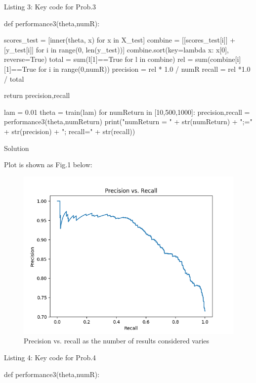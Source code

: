 \documentclass{assignment}
\begin{document}
\begin{problemlist}
\vspace{17ex}
\begin{center} 
Listing 3: Key code for Prob.3
\end{center}
\begin{python}
def performance3(theta,numR):

    scores_test = [inner(theta, x) for x in X_test]
    combine = [[scores_test[i]] + [y_test[i]] for i in range(0, len(y_test))]
    combine.sort(key=lambda x: x[0], reverse=True)
    total = sum(l[1]==True for l in combine)
    rel = sum(combine[i][1]==True for i in range(0,numR))
    precision = rel * 1.0 / numR
    recall = rel *1.0 / total

    return precision,recall

lam = 0.01
theta = train(lam)
for numReturn in [10,500,1000]:
    precision,recall = performance3(theta,numReturn)
    print("numReturn = " + str(numReturn) + ";\tprecision=" + str(precision) + "; recall=" + str(recall))
\end{python}

\pbitem Solution

Plot is shown as Fig.1 below:
\begin{figure}[H]
\centering
\includegraphics[width=5in]{figure_4}
\caption{Precision vs. recall as the number of results considered varies }
\end{figure}

\begin{center} 
Listing 4: Key code for Prob.4
\end{center}
\begin{python}
def performance3(theta,numR):


\end{python}
\end{problemlist}
\end{document}
